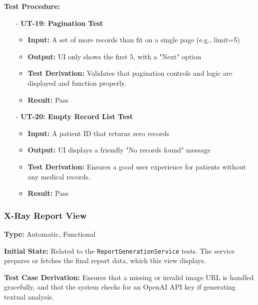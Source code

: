 \documentclass[12pt, titlepage]{article}
\begin{document}
\noindent \textbf{Test Procedure:}
\begin{itemize}
   \item[-] \textbf{UT-19: Pagination Test} \label{test:medrec-list-paginate}
   \begin{itemize}
     \item \textbf{Input:} A set of more records than fit on a single page (e.g., limit=5)
     \item \textbf{Output:} UI only shows the first 5, with a "Next" option
     \item \textbf{Test Derivation:} Validates that pagination controls and logic are displayed and function properly.
     \item \textbf{Result:} Pass
   \end{itemize}

   \item[-] \textbf{UT-20: Empty Record List Test} \label{test:medrec-list-empty}
   \begin{itemize}
     \item \textbf{Input:} A patient ID that returns zero records
     \item \textbf{Output:} UI displays a friendly "No records found" message
     \item \textbf{Test Derivation:} Ensures a good user experience for patients without any medical records.
     \item \textbf{Result:} Pass
   \end{itemize}
\end{itemize}
\vspace{10pt}


\subsubsection{X-Ray Report View}
\textbf{Type:} Automatic, Functional
\vspace{10pt}

\noindent \textbf{Initial State:}
Related to the \texttt{ReportGenerationService} tests. The service prepares or fetches the final report data, which this view displays.
\vspace{10pt}

\noindent \textbf{Test Case Derivation:}
Ensures that a missing or invalid image URL is handled gracefully, and that the system checks for an OpenAI API key if generating textual analysis.
\vspace{10pt}
\end{document}
